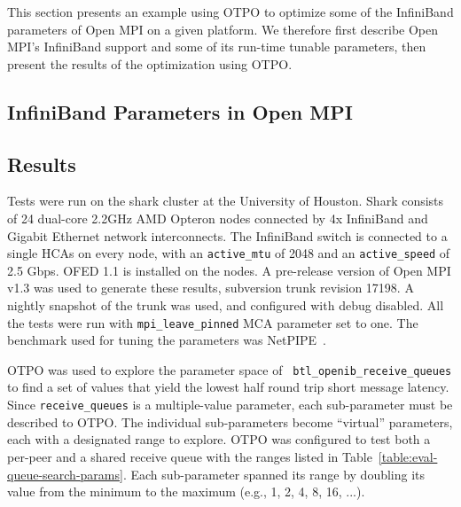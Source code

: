 This section presents an example using OTPO to optimize some of the
InfiniBand parameters of Open MPI on a given platform.  We therefore
first describe Open MPI's InfiniBand support and some of its run-time
tunable parameters, then present the results of the optimization using
OTPO.

\subsection{InfiniBand Parameters in Open MPI}



\subsection{Results}

Tests were run on the shark cluster at the University of Houston.
Shark consists of 24 dual-core 2.2GHz AMD Opteron nodes connected by
4x InfiniBand and Gigabit Ethernet network interconnects.  
The InfiniBand switch is connected to a single HCAs on every node, with an {\tt active\_mtu} of 2048 and an {\tt active\_speed} of 2.5 Gbps. OFED 1.1 is installed on the nodes.  A pre-release version of Open MPI v1.3 was used to generate these results, subversion trunk revision 17198. A nightly snapshot of the trunk was used, and configured with debug disabled. All the tests were run with
{\tt mpi\_leave\_pinned} MCA parameter set to one. The benchmark used for tuning the parameters was NetPIPE~\cite{netpipe}.

OTPO was used to explore the parameter space of {\tt
  btl\_\-openib\_\-receive\_\-queues} to find a set of values that
yield the lowest half round trip short message latency.  Since {\tt receive\_\-queues}
is a multiple-value parameter, each sub-parameter must be described to
OTPO.  The individual sub-parameters become ``virtual'' parameters,
each with a designated range to explore.  OTPO was configured to test
both a per-peer and a shared receive queue with the ranges listed in
Table~\ref{table:eval-queue-search-params}.  Each sub-parameter
spanned its range by doubling its value from the minimum to the
maximum (e.g., 1, 2, 4, 8, 16, ...).

\def\yes{$\sqrt{}$}

